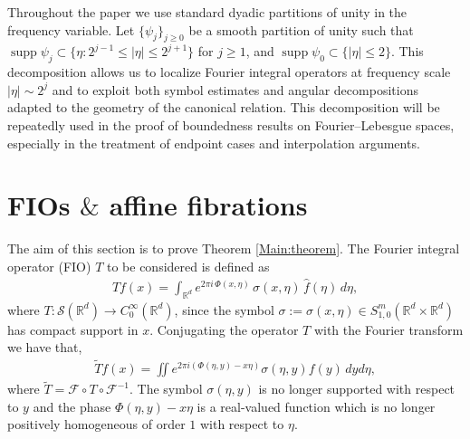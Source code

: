 \documentclass[12pt, reqno]{amsart}
\theoremstyle{definition}
\theoremstyle{remark}
\numberwithin{equation}{section}
\begin{document}
Throughout the paper we use standard dyadic partitions of unity in the frequency
variable. Let $\{\psi_j\}_{j\ge0}$ be a smooth partition of unity such that
$\operatorname{supp}\psi_j\subset\{\eta:2^{j-1}\le|\eta|\le2^{j+1}\}$ for $j\ge1$,
and $\operatorname{supp}\psi_0\subset\{|\eta|\le2\}$. This decomposition allows us to localize Fourier integral operators at frequency
scale $|\eta|\sim2^j$ and to exploit both symbol estimates and angular
decompositions adapted to the geometry of the canonical relation. This decomposition will be repeatedly used in the proof of boundedness results
on Fourier--Lebesgue spaces, especially in the treatment of endpoint cases and
interpolation arguments.

\section{FIOs $\&$ affine fibrations}\label{Proof:main:theorem:section}


The aim of this section is to prove Theorem \ref{Main:theorem}. 
The Fourier integral operator (FIO) $T$ to be considered is defined as
\begin{align}
Tf(x)= \int_{\mathbb{R}^d} e^{2\pi i\, \Phi(x,\eta)}\, \sigma(x,\eta)\, \widehat{f}(\eta)\, d\eta,
\end{align}
where $T:\mathcal{S}(\mathbb{R}^d)\to C^{\infty}_0(\mathbb{R}^{d})$, since the symbol $\sigma:=\sigma(x,\eta)\in S^m_{1,0}
(\mathbb{R}^d\times \mathbb{R}^d)$ has compact support in $x$.  Conjugating the operator $T$ with the Fourier transform we have that,
     \begin{align}
     \tilde{T}f(x)=\displaystyle{\iint} e^{2\pi i(\Phi(\eta,y)-x\eta)}\sigma(\eta,y)f(y)\,dyd\eta, \label{71}
     \end{align}
     where $\tilde{T}=\mathcal{F}\circ T \circ \mathcal{F}^{-1}$. The symbol $\sigma(\eta,y)$ is no longer supported with respect to $y$ and the phase $\Phi(\eta,y)-x\eta$  is a real-valued function which is no longer positively homogeneous of order $1$ with respect to $\eta$.
\end{document}
